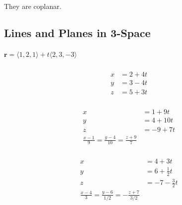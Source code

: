 \documentclass{article}
\begin{document}
They are coplanar.

\subsection{Lines and Planes in 3-Space}

\subsubsection{}

$\mathbf{r} = \langle 1, 2, 1 \rangle + t \langle 2, 3, -3 \rangle$

\setcounter{subsubsection}{6}
\subsubsection{}

\begin{align*}
  x & = 2 + 4 t \\
  y & = 3 - 4 t \\
  z & = 5 + 3 t
\end{align*}

\setcounter{subsubsection}{12}
\subsubsection{}

\begin{align*}
  x & = 1 + 9 t  \\
  y & = 4 + 10 t \\
  z & = -9 + 7 t \\
  \frac{x - 1}{9} = \frac{y - 4}{10} = \frac{z + 9}{7}
\end{align*}

\setcounter{subsubsection}{18}
\subsubsection{}

\begin{align*}
  x & = 4 + 3 t            \\
  y & = 6 + \frac{1}{2} t  \\
  z & = -7 - \frac{3}{2} t \\
  \frac{x - 4}{3} = \frac{y - 6}{1 / 2} = -\frac{z + 7}{3 / 2}
\end{align*}

\setcounter{subsubsection}{22}
\subsubsection{}
\end{document}
